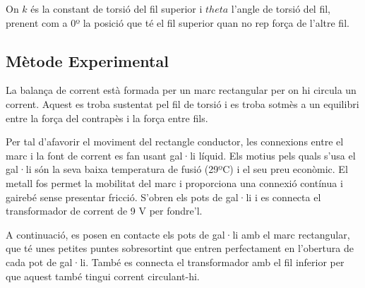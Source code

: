 \documentclass[11pt]{article}
\numberwithin{equation}{section}
\numberwithin{figure}{section}
\numberwithin{table}{section}
\begin{document}
On $k$ és la constant de torsió del fil superior i $theta$ l'angle de torsió del fil, prenent com a 0º la posició que té el fil superior quan no rep força de l'altre fil.

\subsection{Mètode Experimental}\label{sec: PR2_met_exp}

La balança de corrent està formada per un marc rectangular per on hi circula un corrent. Aquest es troba sustentat pel fil de torsió i es troba sotmès a un equilibri entre la força del contrapès i la força entre fils. 

Per tal d'afavorir el moviment del rectangle conductor, les
connexions entre el marc i la font de corrent es fan usant gal·li líquid. Els motius pels quals s'usa el gal·li són la seva baixa temperatura de fusió (29ºC) i el seu preu econòmic. El metall fos permet la mobilitat del marc i proporciona una connexió contínua i gairebé sense presentar fricció. S'obren els pots de gal·li i es connecta el transformador de corrent de 9 V per fondre'l. 

A continuació, es posen en contacte els pots de gal·li amb el marc rectangular, que té unes petites puntes sobresortint que entren perfectament en l'obertura de cada pot de gal·li. També es connecta el transformador amb el fil inferior per que aquest també tingui corrent circulant-hi.

\end{document}
